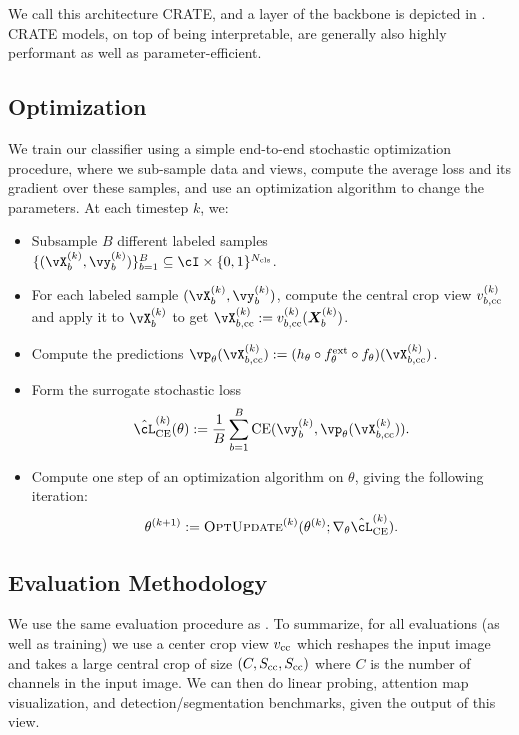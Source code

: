 \documentclass[../../book-main.tex]{subfiles}
\begin{document}
We call this architecture CRATE, and a layer of the backbone is depicted in . CRATE models, on top of being interpretable, are generally also highly performant as well as parameter-efficient. 

\subsection{Optimization} \label{sub:image_classification_optimization}

We train our classifier using a simple end-to-end stochastic optimization procedure, where we sub-sample data and views, compute the average loss and its gradient over these samples, and use an optimization algorithm to change the parameters. At each timestep \(k\), we:
\begin{itemize}
    \item Subsample \(B\) different labeled samples \(\{(\vX_{b}^{(k)}, \vy_{b}^{(k)})\}_{b = 1}^{B} \subseteq \cI \times \{0, 1\}^{N_{\cls}}\).
    \item For each labeled sample \((\vX_{b}^{(k)}, \vy_{b}^{(k)})\), compute the central crop view \(v_{b, \mathrm{cc}}^{(k)}\) and apply it to \(\vX_{b}^{(k)}\) to get \(\vX_{b, \cc}^{(k)} := v_{b, \cc}^{(k)}(\X_{b}^{(k)})\).
    \item Compute the predictions \(\vp_{\theta}(\vX_{b, \cc}^{(k)}) := (h_{\theta} \circ f_{\theta}^{\ext} \circ f_{\theta})(\vX_{b, \cc}^{(k)})\).
    \item Form the surrogate stochastic loss 
    \begin{equation}
        \hat{\cL}_{\CE}^{(k)}(\theta) := \frac{1}{B}\sum_{b = 1}^{B}\CE(\vy_{b}^{(k)}, \vp_{\theta}(\vX_{b, \cc}^{(k)})).
    \end{equation}
    \item Compute one step of an optimization algorithm on \(\theta\), giving the following iteration:
    \begin{equation}
        \theta^{(k + 1)} := \textsc{OptUpdate}^{(k)}(\theta^{(k)}; \nabla_{\theta}\hat{\cL}_{\CE}^{(k)}).
    \end{equation}
\end{itemize}


\subsection{Evaluation Methodology} \label{sub:image_classification_evals}

We use the same evaluation procedure as . To summarize, for all evaluations (as well as training) we use a center crop view \(v_{\mathrm{cc}}\) which reshapes the input image and takes a large central crop of size \((C, S_{\mathrm{cc}}, S_{\mathrm{cc}})\) where \(C\) is the number of channels in the input image. We can then do linear probing, attention map visualization, and detection/segmentation benchmarks, given the output of this view.
\end{document}
